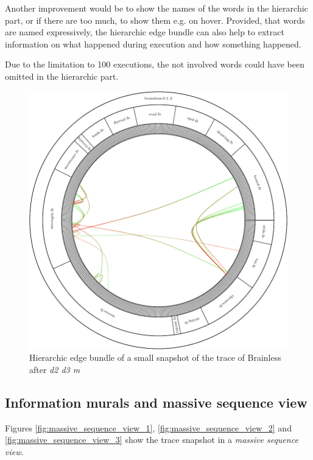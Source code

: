 Another improvement would be to show the names of the words in the hierarchic part, or if there are too much, to show them e.g. on hover.
Provided, that words are named expressively, the hierarchic edge bundle can also help to extract information on what happened during execution and how something happened. 

Due to the limitation to 100 executions, the not involved words could have been omitted in the hierarchic part.

\begin{figure}[p]
    \centering
    \includegraphics[scale=0.65]{graphics/hierarchic_edge_bundle-dir_file_word.png}
    \caption{Hierarchic edge bundle of a small snapshot of the trace of Brainless after \emph{d2 d3 m}}
    \label{fig:hierarchic_edge_bundle}
\end{figure}


\subsection*{Information murals and massive sequence view}

Figures \ref{fig:massive_sequence_view_1}, \ref{fig:massive_sequence_view_2} and \ref{fig:massive_sequence_view_3} show the trace snapshot in a \emph{massive sequence view}.

